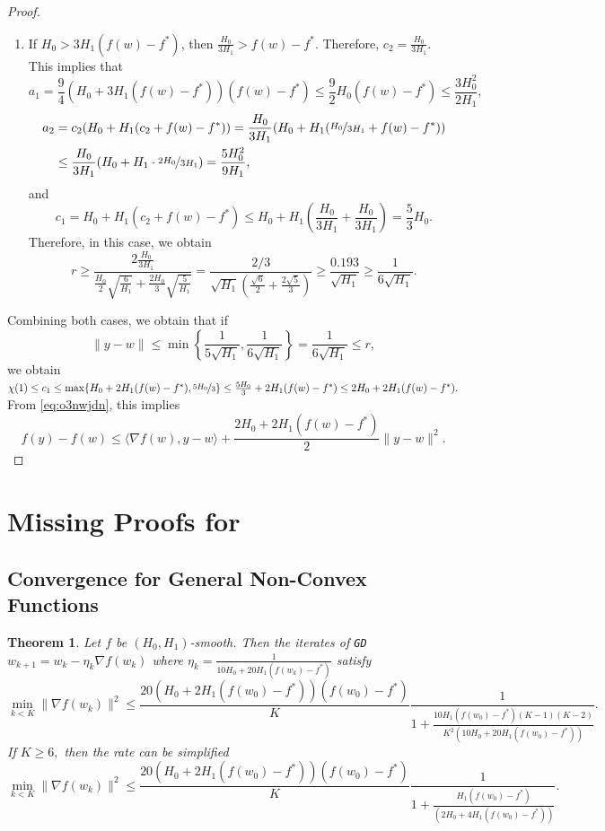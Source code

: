 \documentclass[a4paper,11pt]{article}
\newcommand{\algname}[1]{\texttt{#1}}
\newcommand{\1}{\mathbbm{1}}
\theoremstyle{plain}
\newtheorem{theorem}{Theorem}[section]
\begin{document}
\begin{proof}
\begin{enumerate}
    \item If $H_0 > 3H_1(f(w) - f^*)$, then $\frac{H_0}{3H_1}> f(w)-f^*$. Therefore,  $c_2 = \frac{H_0}{3H_1}.$ This implies that 
    \[
    a_1 = \frac{9}{4}(H_0 + 3H_1(f(w) - f^*))(f(w) - f^*) \le \frac{9}{2}H_0(f(w) - f^*) \le \frac{3H_0^2}{2H_1},\]
    \begin{align*}
    a_2 &= c_2(H_0 + H_1(c_2 + f(w) - f^*)) = \frac{H_0}{3H_1}(H_0 + H_1(\nicefrac{H_0}{3H_1} + f(w) - f^*))\\
    &\le \frac{H_0}{3H_1}(H_0 + H_1\cdot \nicefrac{2H_0}{3H_1}) = \frac{5H_0^2}{9H_1},
    \end{align*}
    and 
    \[
    c_1 = H_0 + H_1(c_2 + f(w)-f^*) \le H_0 + H_1\left(\frac{H_0}{3H_1} + \frac{H_0}{3H_1}\right) = \frac{5}{3}H_0.
    \]
    Therefore, in this case, we obtain
    \[
    r \ge \frac{2\frac{H_0}{3H_1}}{\frac{H_0}{2}\sqrt{\frac{6}{H_1}} + \frac{2H_0}{3}\sqrt{\frac{5}{H_1}}} = \frac{2/3}{\sqrt{H_1}(\frac{\sqrt{6}}{2} + \frac{2\sqrt{5}}{3})} \ge \frac{0.193}{\sqrt{H_1}} \ge \frac{1}{6\sqrt{H_1}}.
    \]

    \end{enumerate}
    Combining both cases, we obtain that if 
    \[
    \|y-w\| \le \min\left\{\frac{1}{5\sqrt{H_1}}, \frac{1}{6\sqrt{H_1}}\right\} = \frac{1}{6\sqrt{H_1}} \le r,
    \]
    we obtain $\chi(1) \le c_1 \le \max\{H_0 + 2H_1(f(w) - f^*), \nicefrac{5H_0}{3}\} \le \frac{5H_0}{3} + 2H_1(f(w) - f^*) \le 2H_0 + 2H_1(f(w) - f^*).$ From \eqref{eq:o3nwjdn}, this implies 
    \[
    f(y) - f(w) \le \langle\nabla f(w), y-w \rangle + \frac{2H_0 + 2H_1(f(w) - f^*)}{2}\|y-w\|^2.
    \]
\end{proof}


\section{Missing Proofs for }
\label{sec:conv_proofs_non_convex}

\subsection{Convergence for General Non-Convex Functions}

\begin{theorem}\label{th:general_nonconvex_adaptive} Let $f$ be $(H_0,H_1)$-smooth. Then the iterates of \algname{GD} $w_{k+1} = w_k - \eta_k \nabla f(w_k)$ where $\eta_k = \frac{1}{10H_0 + 20H_1(f(w_k) - f^*)}$ satisfy
\[
 \min_{k<K}\|\nabla f(w_k)\|^2 \le \frac{20(H_0+2H_1(f(w_0)-f^*))(f(w_0)-f^*)}{K}\frac{1}{1+\frac{10H_1(f(w_0)-f^*)(K-1)(K-2)}{K^2(10H_0+20H_1(f(w_0)-f^*))}}. 
\]
If $K \ge 6,$ then the rate can be simplified
\[
 \min_{k<K}\|\nabla f(w_k)\|^2 \le \frac{20(H_0+2H_1(f(w_0)-f^*))(f(w_0)-f^*)}{K}\frac{1}{1+\frac{H_1(f(w_0)-f^*)}{(2H_0+4H_1(f(w_0)-f^*))}}. 
\]
\end{theorem}
\end{document}
